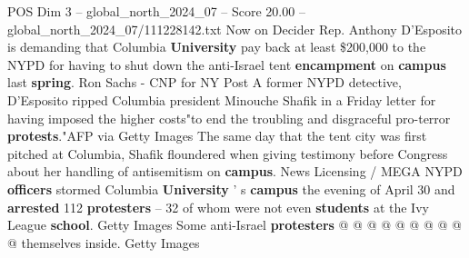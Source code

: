 \begin{textsample}{POS Dim 3 – global\_north\_2024\_07 – Score 20.00 – global\_north\_2024\_07/111228142.txt}
Now on Decider Rep.
Anthony D'Esposito is demanding that Columbia \textbf{University} pay back at least \$200,000 to the NYPD for having to shut down the anti-Israel tent \textbf{encampment} on \textbf{campus} last \textbf{spring}.
Ron Sachs - CNP for NY Post A former NYPD detective, D'Esposito ripped Columbia president Minouche Shafik in a Friday letter for having imposed the higher costs"to end the troubling and disgraceful pro-terror \textbf{protests}."AFP via Getty Images The same day that the tent city was first pitched at Columbia, Shafik floundered when giving testimony before Congress about her handling of antisemitism on \textbf{campus}.
News Licensing / MEGA NYPD \textbf{officers} stormed Columbia \textbf{University} ' s \textbf{campus} the evening of April 30 and \textbf{arrested} 112 \textbf{protesters} -- 32 of whom were not even \textbf{students} at the Ivy League \textbf{school}.
Getty Images Some anti-Israel \textbf{protesters} @ @ @ @ @ @ @ @ @ @ themselves inside.
Getty Images

\end{textsample}
